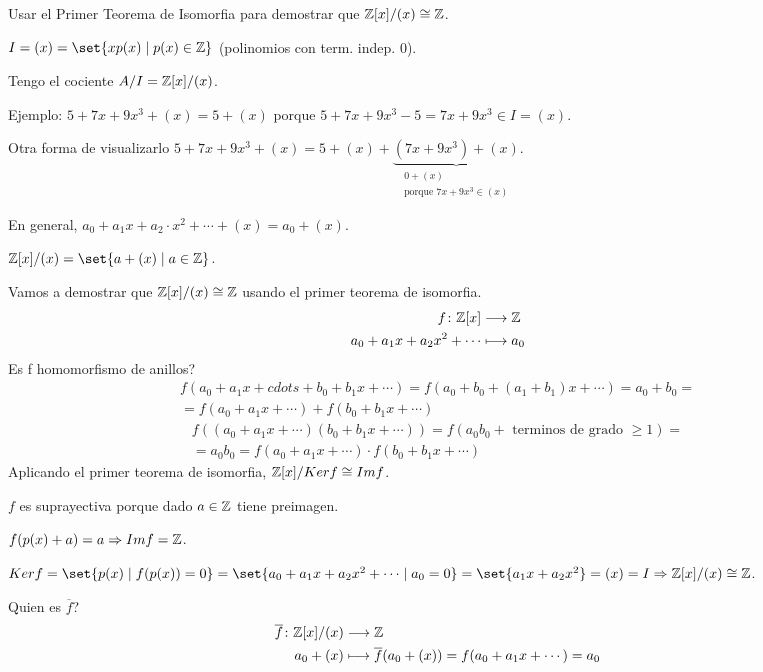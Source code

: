 \begin{example}
	Usar el Primer Teorema de Isomorfia para demostrar que \(\mathbb{Z}[x]/(x) \cong \mathbb{Z} \).
	
	\(I = (x) = \set{xp(x) \mid p(x) \in \Z }\) (polinomios con term. indep. 0).
	
	Tengo el cociente \(A/I = \mathbb{Z}[x]/(x)\).
	
	Ejemplo: \(5 + 7x + 9x^{3} + (x) = 5 + (x) \) porque \(5 + 7x + 9x^{3} - 5 = 7x + 9x^{3} \in I = (x)  \).
	
	Otra forma de visualizarlo \(5 + 7x + 9x^{3} + (x) = 5 + (x) + \underbrace{(7x + 9x^{3} ) + (x)}_{\substack{0 + (x) \\ \text{porque } 7x + 9x^{3} \in (x) }} \).
	
	En general, \(a_0 + a_1 x + a_2 \cdot x^{2} + \cdots + (x) = a_0 + (x) \).
	
	\(\Z[x]/(x) = \set{a + (x) \mid a \in \Z }\).
	
	Vamos a demostrar que \(\mathbb{Z}[x]/(x) \cong \mathbb{Z} \) usando el primer teorema de isomorfia.
	\[
		\begin{aligned}
			f \colon \mathbb{Z}[x ]                 & \longrightarrow \mathbb{Z} \\
			a_0 + a_1x + a_2 x^{2} + \cdots & \longmapsto a_0
		\end{aligned}
	\]
	Es f homomorfismo de anillos?
	\begin{multline*}
		f(a_0 + a_1 x + cdots + b_0 + b_1 x + \cdots ) = f(a_0 + b_0 + (a_1 + b_1) x + \cdots) = a_0 + b_0 = \\ = f(a_0 + a_1 x + \cdots) +  f(b_0 + b_1 x + \cdots)
	\end{multline*}
	\begin{multline*}
		f((a_0 + a_1 x + \cdots) (b_0 + b_1 x + \cdots)) = f(a_0 b_0 + \text{ terminos de grado } \geq 1 ) = \\ = a_0 b_0 = f(a_0 + a_1 x + \cdots) \cdot f(b_0 + b_1 x + \cdots )
	\end{multline*}
	Aplicando el primer teorema de isomorfia, \(\mathbb{Z}[x]/Kerf \cong Imf \).
	
	\(f \) es suprayectiva porque dado \(a \in \mathbb{Z} \) tiene preimagen.
	
	\(f(p(x) + a) = a \Rightarrow Imf = \mathbb{Z}\).
	
	\(Kerf = \set{p(x) \mid f(p(x)) = 0 } = \set{a_0 + a_1 x + a_2 x^{2} + \cdots \mid a_ 0 = 0 } = \set{a_1 x + a_2 x^{2} } = (x) = I \Rightarrow \Z[x]/(x) \cong \Z\).
	
	Quien es \(\overline{f }\)?
	\[
		\begin{aligned}
			\overline{f} \colon \mathbb{Z}[x]/(x ) & \longrightarrow \mathbb{Z}                                                     \\
			a_0 + (x )                     & \longmapsto \overline{f} (a_0 + (x )) = f(a_0 + a_1 x + \cdots) = a_0
		\end{aligned}
	\]
	
\end{example}
